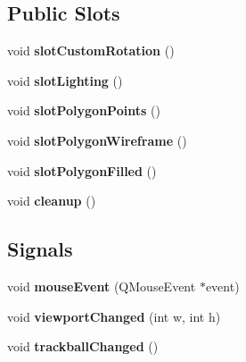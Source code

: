 \subsection*{Public Slots}
\begin{DoxyCompactItemize}
\item 
\mbox{\label{class_cg_qt_g_l_render_widget_a47eb9a80c4ea5ad9479a602de9e1c858}} 
void {\bfseries slot\+Custom\+Rotation} ()
\item 
\mbox{\label{class_cg_qt_g_l_render_widget_a0337b95870f96273bcb0be3f69321051}} 
void {\bfseries slot\+Lighting} ()
\item 
\mbox{\label{class_cg_qt_g_l_render_widget_a0dd60b0fc4ad75d6990ea9c2809413eb}} 
void {\bfseries slot\+Polygon\+Points} ()
\item 
\mbox{\label{class_cg_qt_g_l_render_widget_ac591d742462f76194496651256586925}} 
void {\bfseries slot\+Polygon\+Wireframe} ()
\item 
\mbox{\label{class_cg_qt_g_l_render_widget_a42b1ed079e931cb73bbe1b3acd08f92e}} 
void {\bfseries slot\+Polygon\+Filled} ()
\item 
\mbox{\label{class_cg_qt_g_l_render_widget_ab43f0f04bdd33636ecf41d7a2467284b}} 
void {\bfseries cleanup} ()
\end{DoxyCompactItemize}
\subsection*{Signals}
\begin{DoxyCompactItemize}
\item 
\mbox{\label{class_cg_qt_g_l_render_widget_ac005a3c1ee13cbc1961e5a3d50a70d21}} 
void {\bfseries mouse\+Event} (Q\+Mouse\+Event $\ast$event)
\item 
\mbox{\label{class_cg_qt_g_l_render_widget_aac0d5f2454410d4205f7e45cf0c76afc}} 
void {\bfseries viewport\+Changed} (int w, int h)
\item 
\mbox{\label{class_cg_qt_g_l_render_widget_a0014bb3cef2f6df585687485612e9491}} 
void {\bfseries trackball\+Changed} ()
\end{DoxyCompactItemize}

